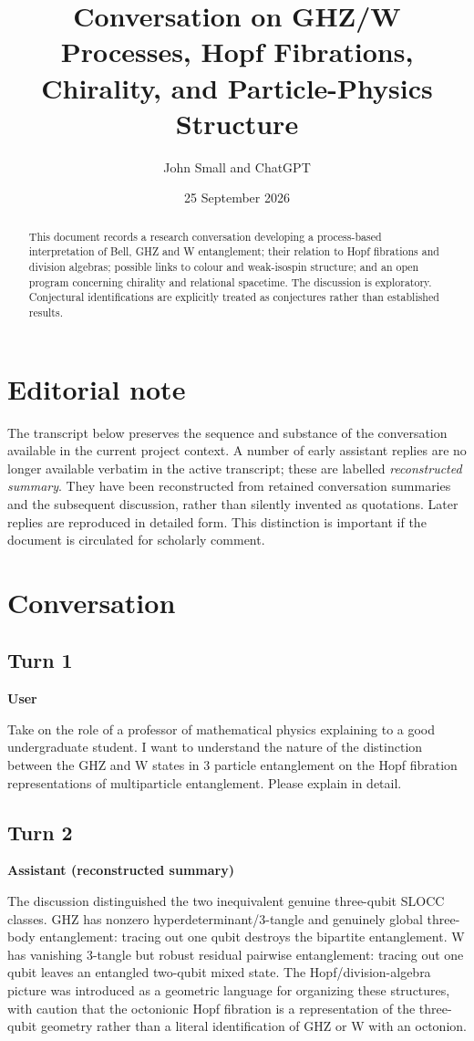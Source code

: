 \documentclass[11pt,a4paper]{article}
\title{Conversation on GHZ/W Processes, Hopf Fibrations, Chirality, and Particle-Physics Structure}
\author{John Small and ChatGPT}
\date{25 September 2026}
\newcommand{\speaker}[1]{\par\medskip\noindent\textbf{\large #1}\par\smallskip}
\begin{document}
\maketitle
\begin{abstract}
This document records a research conversation developing a process-based interpretation of Bell, GHZ and W entanglement; their relation to Hopf fibrations and division algebras; possible links to colour and weak-isospin structure; and an open program concerning chirality and relational spacetime. The discussion is exploratory. Conjectural identifications are explicitly treated as conjectures rather than established results.
\end{abstract}

\section*{Editorial note}
The transcript below preserves the sequence and substance of the conversation available in the current project context. A number of early assistant replies are no longer available verbatim in the active transcript; these are labelled \emph{reconstructed summary}. They have been reconstructed from retained conversation summaries and the subsequent discussion, rather than silently invented as quotations. Later replies are reproduced in detailed form. This distinction is important if the document is circulated for scholarly comment.

\tableofcontents
\newpage
\section{Conversation}
\subsection*{Turn 1}
\speaker{User}
Take on the role of a professor of mathematical physics explaining to a good undergraduate student. I want to understand the nature of the distinction between the GHZ and W states in 3 particle entanglement on the Hopf fibration representations of multiparticle entanglement. Please explain in detail.
\subsection*{Turn 2}
\speaker{Assistant (reconstructed summary)}
The discussion distinguished the two inequivalent genuine three-qubit SLOCC classes. GHZ has nonzero hyperdeterminant/3-tangle and genuinely global three-body entanglement: tracing out one qubit destroys the bipartite entanglement. W has vanishing 3-tangle but robust residual pairwise entanglement: tracing out one qubit leaves an entangled two-qubit mixed state. The Hopf/division-algebra picture was introduced as a geometric language for organizing these structures, with caution that the octonionic Hopf fibration is a representation of the three-qubit geometry rather than a literal identification of GHZ or W with an octonion.
\end{document}
